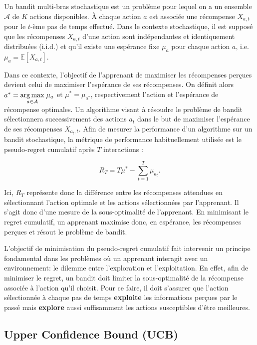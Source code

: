 Un bandit multi-bras stochastique est un problème pour lequel on a un ensemble
$\mathcal{A}$ de $K$ actions disponibles.
À chaque action $a$ est associée une récompense $X_{a,t}$ pour le $t$-ème 
pas de temps effectué.
Dans le contexte stochastique, il est supposé que les récompenses $X_{a,t}$
d'une action sont indépendantes et identiquement distribuées (i.i.d.) 
et qu'il existe une espérance fixe $\mu_a$ pour chaque action $a$,
i.e. $\mu_a = \mathbb{E} \left[X_{a,t} \right]$.

Dans ce contexte, l'objectif de l'apprenant de maximiser les récompenses perçues 
devient celui de maximiser l'espérance de ses récompenses.
On définit alors $a^* = \underset{a \in \mathcal{A}}{\operatorname*{arg\,max}} \; \mu_a$
et $\mu^* = \mu_{a^*}$, respectivement l'action et l'espérance de récompense optimales.
Un algorithme visant à résoudre le problème de bandit sélectionnera
successivement des actions $a_t$ dans le but de  maximiser l'espérance de ses
récompenses $X_{{a_t},t}$.
Afin de mesurer la performance d'un algorithme sur un bandit stochastique, la métrique de performance
habituellement utilisée est le pseudo-regret cumulatif après $T$ interactions :

\begin{equation}
    R_T = T \mu^* -  \sum_{t=1}^T  \mu_{a_t}.
    \label{eq:regret_cumulatif}
\end{equation}

Ici, $R_T$ représente donc la différence entre les récompenses attendues en sélectionnant
l'action optimale et les actions sélectionnées par l'apprenant.
Il s'agit donc d'une mesure de la sous-optimalité de l'apprenant.
En minimisant le regret cumulatif, un apprenant maximise donc, en espérance, 
les récompenses perçues et résout le problème de bandit.

L'objectif de minimisation du pseudo-regret cumulatif fait intervenir un 
principe fondamental dans les problèmes où un apprenant interagit avec 
un environnement: le dilemme entre l'exploration et l'exploitation.
En effet, afin de minimiser le regret, un bandit doit limiter la sous-optimalité de
la récompense associée à l'action qu'il choisit.
Pour ce faire, il doit s'assurer que l'action sélectionnée à chaque 
pas de temps \textbf{exploite} les informations perçues par le passé 
mais \textbf{explore} aussi suffisamment les actions susceptibles 
d'être meilleures.

\subsection{Upper Confidence Bound (UCB)}
\label{subsec:ucb}

